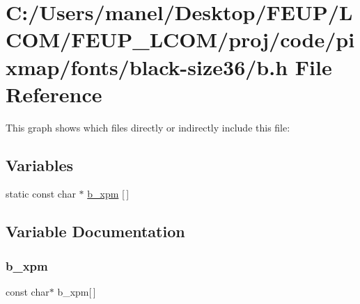 \hypertarget{fonts_2black-size36_2b_8h}{}\section{C\+:/\+Users/manel/\+Desktop/\+F\+E\+U\+P/\+L\+C\+O\+M/\+F\+E\+U\+P\+\_\+\+L\+C\+O\+M/proj/code/pixmap/fonts/black-\/size36/b.h File Reference}
\label{fonts_2black-size36_2b_8h}
This graph shows which files directly or indirectly include this file\+:
\subsection*{Variables}
\begin{DoxyCompactItemize}
\item 
static const char $\ast$ \mbox{\hyperlink{fonts_2black-size36_2b_8h_ac4b54676396bf172f28b025c164a52f7}{b\+\_\+xpm}} \mbox{[}$\,$\mbox{]}
\end{DoxyCompactItemize}


\subsection{Variable Documentation}
\mbox{\label{fonts_2black-size36_2b_8h_ac4b54676396bf172f28b025c164a52f7}} 
\subsubsection{\texorpdfstring{b\_xpm}{b\_xpm}}
{\footnotesize\ttfamily const char$\ast$ b\+\_\+xpm\mbox{[}$\,$\mbox{]}\hspace{0.3cm}{\ttfamily [static]}}

